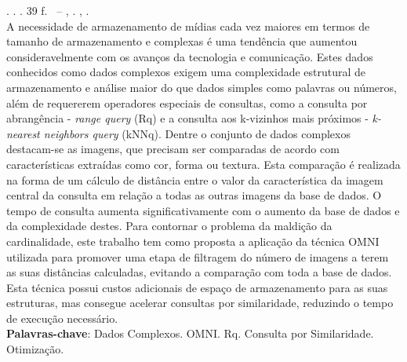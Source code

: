 
\begin{resumo}[RESUMO]
\begin{SingleSpacing}
    
\imprimirautorcitacao. \imprimirtitulo. \imprimirdata. 39 f. \imprimirprojeto\ – \imprimirprograma, \imprimirinstituicao. \imprimirlocal, \imprimirdata.\\ 
					
A necessidade de armazenamento de mídias cada vez maiores em termos de tamanho de armazenamento e complexas é uma tendência que aumentou consideravelmente
com os avanços da tecnologia e comunicação. Estes dados conhecidos como dados complexos exigem uma complexidade estrutural
de armazenamento e análise maior do que dados simples como palavras ou números, além de requererem operadores especiais
de consultas, como a consulta por abrangência - \textit{range query} (Rq) e a consulta aos k-vizinhos mais próximos - \textit{k-nearest neighbors query} (kNNq). Dentre o conjunto de dados complexos
destacam-se as imagens, que precisam ser comparadas de acordo com características extraídas como cor, forma ou textura. Esta
comparação é realizada na forma de um cálculo de distância entre o valor da característica da imagem central da consulta em relação
a todas as outras imagens da base de dados. O tempo de consulta aumenta significativamente com o aumento da base de dados e da complexidade destes. 
Para contornar o problema da maldição da cardinalidade, este trabalho tem como proposta a aplicação da técnica OMNI utilizada para promover 
uma etapa de filtragem do número de imagens a terem as suas distâncias calculadas, evitando a comparação com toda a base de dados. Esta técnica
possui custos adicionais de espaço de armazenamento para as suas estruturas, mas consegue acelerar consultas por similaridade, reduzindo
o tempo de execução necessário.
\\

\textbf{Palavras-chave}: Dados Complexos. OMNI. Rq. Consulta por Similaridade. Otimização.

\end{SingleSpacing}
\end{resumo}


